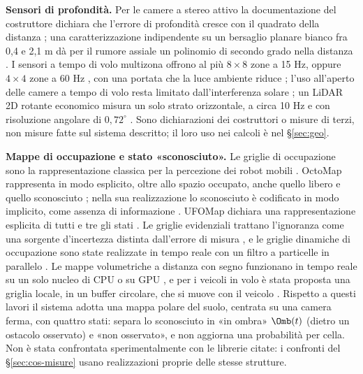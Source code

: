 \textbf{Sensori di profondità.} Per le camere a stereo attivo la documentazione del costruttore dichiara che l'errore di profondità cresce con il quadrato della distanza \cite{realsense-taratura-profondita}; una caratterizzazione indipendente su un bersaglio planare bianco fra 0,4 e 2,1 m dà per il rumore assiale un polinomio di secondo grado nella distanza \cite{ahn2019}. I sensori a tempo di volo multizona offrono al più $8\times8$ zone a 15 Hz, oppure $4\times4$ zone a 60 Hz \cite{st-um2884}, con una portata che la luce ambiente riduce \cite{st-vl53l7cx}; l'uso all'aperto delle camere a tempo di volo resta limitato dall'interferenza solare \cite{qiu2023}; un LiDAR 2D rotante economico misura un solo strato orizzontale, a circa 10 Hz e con risoluzione angolare di $0{,}72^\circ$ \cite{slamtec-rplidar-c1}. Sono dichiarazioni dei costruttori o misure di terzi, non misure fatte sul sistema descritto; il loro uso nei calcoli è nel \S\ref{sec:geo}.

\textbf{Mappe di occupazione e stato «sconosciuto».} Le griglie di occupazione sono la rappresentazione classica per la percezione dei robot mobili \cite{elfes1989}. OctoMap rappresenta in modo esplicito, oltre allo spazio occupato, anche quello libero e quello sconosciuto \cite{hornung2013}; nella sua realizzazione lo sconosciuto è codificato in modo implicito, come assenza di informazione \cite{octomap}. UFOMap dichiara una rappresentazione esplicita di tutti e tre gli stati \cite{duberg2020}. Le griglie evidenziali trattano l'ignoranza come una sorgente d'incertezza distinta dall'errore di misura \cite{moras2011}, e le griglie dinamiche di occupazione sono state realizzate in tempo reale con un filtro a particelle in parallelo \cite{nuss2018}. Le mappe volumetriche a distanza con segno funzionano in tempo reale su un solo nucleo di CPU \cite{oleynikova2017} o su GPU \cite{millane2024,niessner2013}, e per i veicoli in volo è stata proposta una griglia locale, in un buffer circolare, che si muove con il veicolo \cite{usenko2017}. Rispetto a questi lavori il sistema adotta una mappa polare del suolo, centrata su una camera ferma, con quattro stati: separa lo sconosciuto in «in ombra» $\Omb(t)$ (dietro un ostacolo osservato) e «non osservato», e non aggiorna una probabilità per cella. Non è stata confrontata sperimentalmente con le librerie citate: i confronti del \S\ref{sec:cos-misure} usano realizzazioni proprie delle stesse strutture.

